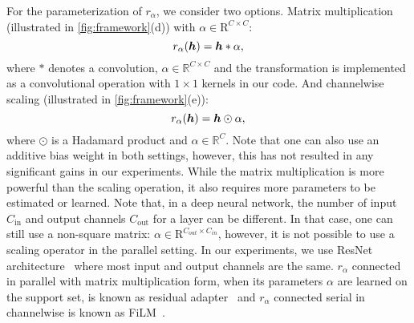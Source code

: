 For the parameterization of $r_{\alpha}$, we consider two options.
Matrix multiplication (illustrated in \cref{fig:framework}(d)) with $\alpha\in\mathrm{R}^{C\times C}$:
\[
    r_{\alpha}(\bm{h}) = \bm{h} \ast \alpha,
\] where $\ast$ denotes a convolution, $\alpha\in \mathbb{R}^{C\times C}$ and the transformation is implemented as a convolutional operation with $1\times 1$ kernels in our code.
And channelwise scaling (illustrated in \cref{fig:framework}(e)):
\[
    r_{\alpha}(\bm{h}) = \bm{h} \odot \alpha,
\] where $\odot$ is a Hadamard product and $\alpha\in \mathbb{R}^C$.
Note that one can also use an additive bias weight in both settings, however, this has not resulted in any significant gains in our experiments. 
While the matrix multiplication is more powerful than the scaling operation, it also requires more parameters to be estimated or learned.
Note that, in a deep neural network, the number of input $C_{\text{in}}$ and output channels $C_{\text{out}}$ for a layer can be different. 
In that case, one can still use a non-square matrix: $\alpha\in\mathrm{R}^{C_{out}\times C_{in}}$, however, it is not possible to use a scaling operator in the parallel setting. 
In our experiments, we use ResNet architecture~\cite{he2016deep} where most input and output channels are the same.
$r_\alpha$ connected in parallel with matrix multiplication form, when its parameters $\alpha$ are learned on the support set, is known as residual adapter~\cite{rebuffi2018efficient} and $r_\alpha$ connected serial in channelwise is known as FiLM~\cite{perez2018film}.

